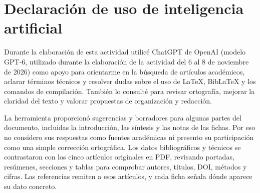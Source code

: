 \documentclass[12pt,a4paper]{article}
\begin{document}
	\section*{Declaración de uso de inteligencia artificial}
	Durante la elaboración de esta actividad utilicé ChatGPT de OpenAI (modelo GPT-6, utilizado durante la elaboración de la actividad del 6 al 8 de noviembre de 2026) como apoyo para orientarme en la búsqueda de artículos académicos, aclarar términos técnicos y resolver dudas sobre el uso de LaTeX, BibLaTeX y los comandos de compilación. También lo consulté para revisar ortografía, mejorar la claridad del texto y valorar propuestas de organización y redacción.
	
	La herramienta proporcionó sugerencias y borradores para algunas partes del documento, incluidas la introducción, las síntesis y las notas de las fichas. Por eso no considero sus respuestas como fuentes académicas ni presento su participación como una simple corrección ortográfica. Los datos bibliográficos y técnicos se contrastaron con los cinco artículos originales en PDF, revisando portadas, resúmenes, secciones y tablas para comprobar autores, títulos, DOI, métodos y cifras. Las referencias remiten a esos artículos, y cada ficha señala dónde aparece su dato concreto.
	
	
	
	\printbibliography[title={Referencias bibliográficas}]
\end{document}
